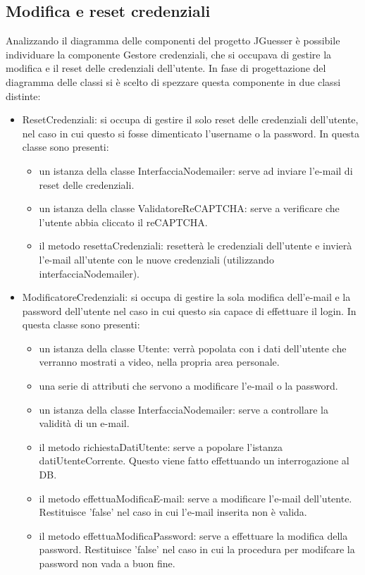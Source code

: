 \subsection{Modifica e reset credenziali}
Analizzando il diagramma delle componenti del progetto JGuesser è possibile individuare la componente Gestore credenziali, che si occupava di gestire la modifica e il reset delle credenziali dell'utente. In fase di progettazione del diagramma delle classi si è scelto di spezzare questa componente in due classi distinte:
\begin{itemize}
    \item ResetCredenziali: si occupa di gestire il solo reset delle credenziali dell'utente, nel caso in cui questo si fosse dimenticato l'username o la password. In questa classe sono presenti:
    \begin{itemize}
        \item un istanza della classe InterfacciaNodemailer: serve ad inviare l'e-mail di reset delle credenziali.
        \item un istanza della classe ValidatoreReCAPTCHA: serve a verificare che l'utente abbia cliccato il reCAPTCHA.
        \item il metodo resettaCredenziali: resetterà le credenziali dell'utente e invierà l'e-mail all'utente con le nuove credenziali (utilizzando interfacciaNodemailer).
    \end{itemize}
    \item ModificatoreCredenziali: si occupa di gestire la sola modifica dell'e-mail e la password dell'utente nel caso in cui questo sia capace di effettuare il login. In questa classe sono presenti:
    \begin{itemize}
        \item un istanza della classe Utente: verrà popolata con i dati dell'utente che verranno mostrati a video, nella propria area personale.
        \item una serie di attributi che servono a modificare l'e-mail o la password.
        \item un istanza della classe InterfacciaNodemailer: serve a controllare la validità di un e-mail.
        \item il metodo richiestaDatiUtente: serve a popolare l'istanza datiUtenteCorrente. Questo viene fatto effettuando un interrogazione al DB.
        \item il metodo effettuaModificaE-mail: serve a modificare l'e-mail dell'utente. Restituisce 'false' nel caso in cui l'e-mail inserita non è valida.
        \item il metodo effettuaModificaPassword: serve a effettuare la modifica della password. Restituisce 'false' nel caso in cui la procedura per modifcare la password non vada a buon fine.
    \end{itemize}
\end{itemize}


